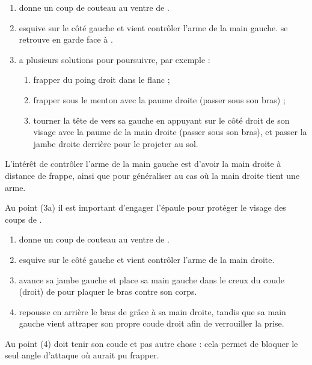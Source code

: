 \begin{technique}

\begin{enumerate}
	\item \A donne un coup de couteau au ventre de \D.
	
	\item \D esquive sur le côté gauche et vient contrôler l'arme de la main gauche.
	\D se retrouve en garde face à \A.
	
	\item \D a plusieurs solutions pour poursuivre, par exemple :
	\begin{enumerate}
		\item frapper du poing droit dans le flanc ;
		
		\item frapper \A sous le menton avec la paume droite (passer sous son bras) ;
		
		\item tourner la tête de \A vers sa gauche en appuyant sur le côté droit de son visage avec la paume de la main droite (passer sous son bras), et passer la jambe droite derrière \A pour le projeter au sol.
	\end{enumerate}
\end{enumerate}

L'intérêt de contrôler l'arme de la main gauche est d'avoir la main droite à distance de frappe, ainsi que pour généraliser au cas où la main droite tient une arme.

Au point (3a) il est important d'engager l'épaule pour protéger le visage des coups de \A.

\end{technique}


\begin{technique}

\begin{enumerate}
	\item \A donne un coup de couteau au ventre de \D.
	
	\item \D esquive sur le côté gauche et vient contrôler l'arme de la main droite.
	
	\item \D avance sa jambe gauche et place sa main gauche dans le creux du coude (droit) de \A pour plaquer le bras contre son corps.
	
	\item \D repousse en arrière le bras de \A grâce à sa main droite, tandis que sa main gauche vient attraper son propre coude droit afin de verrouiller la prise.
\end{enumerate}

Au point (4) \D doit tenir son coude et pas autre chose : cela permet de bloquer le seul angle d'attaque où \A aurait pu frapper.

\end{technique}


